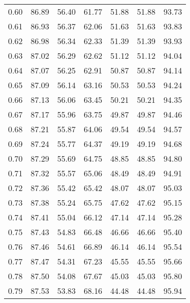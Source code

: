 \begin{tabular}{|c|c|c|c|c|c|c|}
      0.60 &     86.89 &     56.40 &      61.77 &   51.88 &      51.88 &         93.73 \\
      0.61 &     86.93 &     56.37 &      62.06 &   51.63 &      51.63 &         93.83 \\
      0.62 &     86.98 &     56.34 &      62.33 &   51.39 &      51.39 &         93.93 \\
      0.63 &     87.02 &     56.29 &      62.62 &   51.12 &      51.12 &         94.04 \\
      0.64 &     87.07 &     56.25 &      62.91 &   50.87 &      50.87 &         94.14 \\
      0.65 &     87.09 &     56.14 &      63.16 &   50.53 &      50.53 &         94.24 \\
      0.66 &     87.13 &     56.06 &      63.45 &   50.21 &      50.21 &         94.35 \\
      0.67 &     87.17 &     55.96 &      63.75 &   49.87 &      49.87 &         94.46 \\
      0.68 &     87.21 &     55.87 &      64.06 &   49.54 &      49.54 &         94.57 \\
      0.69 &     87.24 &     55.77 &      64.37 &   49.19 &      49.19 &         94.68 \\
      0.70 &     87.29 &     55.69 &      64.75 &   48.85 &      48.85 &         94.80 \\
      0.71 &     87.32 &     55.57 &      65.06 &   48.49 &      48.49 &         94.91 \\
      0.72 &     87.36 &     55.42 &      65.42 &   48.07 &      48.07 &         95.03 \\
      0.73 &     87.38 &     55.24 &      65.75 &   47.62 &      47.62 &         95.15 \\
      0.74 &     87.41 &     55.04 &      66.12 &   47.14 &      47.14 &         95.28 \\
      0.75 &     87.43 &     54.83 &      66.48 &   46.66 &      46.66 &         95.40 \\
      0.76 &     87.46 &     54.61 &      66.89 &   46.14 &      46.14 &         95.54 \\
      0.77 &     87.47 &     54.31 &      67.23 &   45.55 &      45.55 &         95.66 \\
      0.78 &     87.50 &     54.08 &      67.67 &   45.03 &      45.03 &         95.80 \\
      0.79 &     87.53 &     53.83 &      68.16 &   44.48 &      44.48 &         95.94 \\

\end{tabular}
